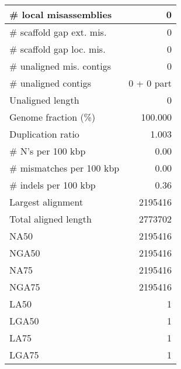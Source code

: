 \documentclass[12pt,a4paper]{article}
\begin{document}
\begin{table}[ht]
\begin{center}
\begin{tabular}{|l*{1}{|r}|}
\# local misassemblies & 0 \\ \hline
\# scaffold gap ext. mis. & 0 \\ \hline
\# scaffold gap loc. mis. & 0 \\ \hline
\# unaligned mis. contigs & 0 \\ \hline
\# unaligned contigs & 0 + 0 part \\ \hline
Unaligned length & 0 \\ \hline
Genome fraction (\%) & 100.000 \\ \hline
Duplication ratio & 1.003 \\ \hline
\# N's per 100 kbp & 0.00 \\ \hline
\# mismatches per 100 kbp & 0.00 \\ \hline
\# indels per 100 kbp & 0.36 \\ \hline
Largest alignment & 2195416 \\ \hline
Total aligned length & 2773702 \\ \hline
NA50 & 2195416 \\ \hline
NGA50 & 2195416 \\ \hline
NA75 & 2195416 \\ \hline
NGA75 & 2195416 \\ \hline
LA50 & 1 \\ \hline
LGA50 & 1 \\ \hline
LA75 & 1 \\ \hline
LGA75 & 1 \\ \hline
\end{tabular}
\end{center}
\end{table}
\end{document}
